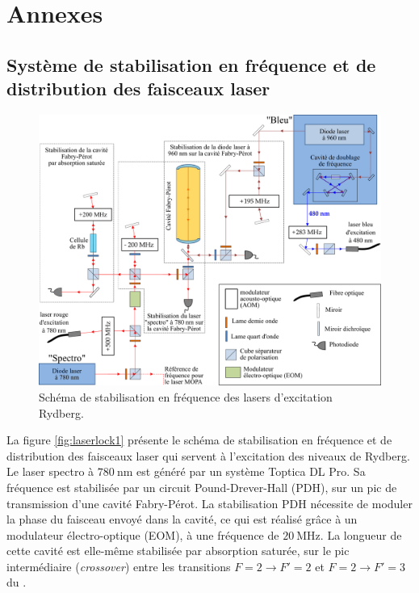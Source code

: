 \part*{Annexes}
\appendix
\renewcommand{\chaptermark}[1]{\markboth{\appendixname\ \thechapter: #1}{}}

\chapter{Système de stabilisation en fréquence et de distribution des faisceaux laser}\label{app:laserlock}

\begin{figure}[h]
\centering
\includegraphics[width=\linewidth]{figures/apx/stabil_laser_1}
\caption[Schéma de stabilisation en fréquence des lasers d'excitation Rydberg]
{
Schéma de stabilisation en fréquence des lasers d'excitation Rydberg.
}
\label{fig:laserlock1}
\end{figure}

\noindent La figure \eqref{fig:laserlock1} présente le schéma de stabilisation en fréquence et de distribution des faisceaux laser qui servent à l'excitation des niveaux de Rydberg.
Le laser \og spectro \fg{} à $\SI{780}{\nano\meter}$ est généré par un système Toptica DL Pro.
Sa fréquence est stabilisée par un circuit Pound-Drever-Hall (PDH), sur un pic de transmission d'une cavité Fabry-Pérot.
La stabilisation PDH nécessite de moduler la phase du faisceau envoyé dans la cavité, ce qui est réalisé grâce à un modulateur électro-optique (EOM), à une fréquence de $\SI{20}{\MHz}$.
La longueur de cette cavité est elle-même stabilisée par absorption saturée, sur le pic intermédiaire (\textit{crossover}) entre les transitions $F=2 \rightarrow F'=2$ et $F=2 \rightarrow F'=3$ du .

